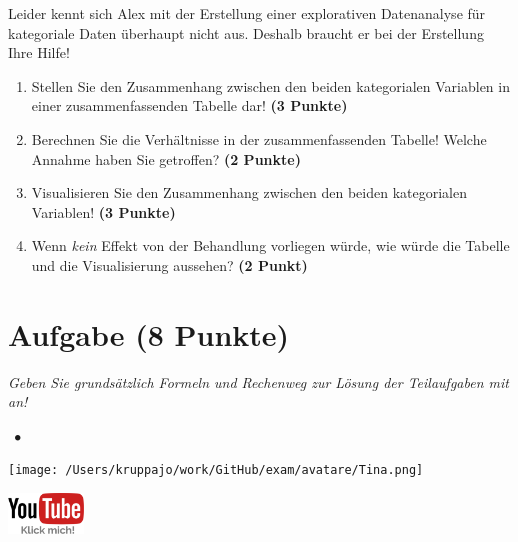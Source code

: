 \documentclass[a4paper, 9pt]{scrartcl}\usepackage[]{graphicx}\usepackage[]{xcolor}
\begin{document}
\vspace{2Ex}

Leider kennt sich Alex mit der Erstellung einer explorativen Datenanalyse für kategoriale Daten überhaupt nicht aus. Deshalb braucht er bei der Erstellung Ihre Hilfe!

\begin{enumerate}
\item Stellen Sie den Zusammenhang zwischen den beiden kategorialen Variablen in einer zusammenfassenden Tabelle dar! \textbf{(3 Punkte)}
\item Berechnen Sie die Verhältnisse in der zusammenfassenden Tabelle! Welche Annahme haben Sie getroffen? \textbf{(2 Punkte)}
\item Visualisieren Sie den Zusammenhang zwischen den beiden kategorialen Variablen! \textbf{(3 Punkte)}
\item Wenn \textit{kein} Effekt von der Behandlung vorliegen würde, wie würde die Tabelle und die Visualisierung aussehen? \textbf{(2 Punkt)}
\end{enumerate} 
\clearpage

\section{Aufgabe \hfill (8 Punkte)}

\textit{Geben Sie grundsätzlich Formeln und Rechenweg zur Lösung der Teilaufgaben mit an!} \\[1Ex]
 

 
\ifcollection
\begin{flushright}
\tiny\vspace{-3Ex}
\textbf{\examinhaltstart}
\exammodulestatversuch $\;\bullet$
\exammodulebiostat
\vspace{-4Ex}
\end{flushright}
\begin{minipage}[t]{0.5\textwidth}
\texttt{[image: /Users/kruppajo/work/GitHub/exam/avatare/Tina.png]}
\end{minipage}
\begin{minipage}[t]{0.5\textwidth}
\hfill
\href{https://youtu.be/n0Wr7VaN3Ao}{\includegraphics[width = 2cm]{img/youtube}}
\end{minipage}
\vspace{-3ex}
\fi
\end{document}
